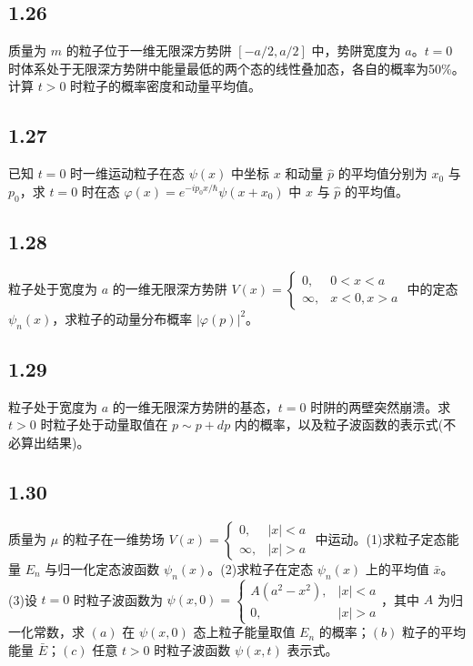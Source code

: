 \subsection{1.26}
质量为 $m$ 的粒子位于一维无限深方势阱 $[-a/2,a/2]$ 中，势阱宽度为 $a$。$t=0$ 时体系处于无限深方势阱中能量最低的两个态的线性叠加态，各自的概率为50\%。计算 $t>0$ 时粒子的概率密度和动量平均值。

\subsection{1.27}
已知 $t = 0$ 时一维运动粒子在态 $\psi (x)$ 中坐标 $x$ 和动量 $\hat{p}$ 的平均值分别为 $x_0$ 与 $p_0$，求 $t = 0$ 时在态 $\varphi (x) = e^{-ip_0 x/\hbar} \psi (x + x_0)$ 中 $x$ 与 $\hat{p}$ 的平均值。

\subsection{1.28}
粒子处于宽度为 $a$ 的一维无限深方势阱 $V(x) = \begin{cases} 
0, & 0 < x < a \\ 
\infty, & x < 0, x > a 
\end{cases}$ 中的定态 $\psi_n(x)$，求粒子的动量分布概率 $|\varphi(p)|^2$。

\subsection{1.29}
粒子处于宽度为 $a$ 的一维无限深方势阱的基态，$t = 0$ 时阱的两壁突然崩溃。求 $t > 0$ 时粒子处于动量取值在 $p \sim p + dp$ 内的概率，以及粒子波函数的表示式(不必算出结果)。

\subsection{1.30}
质量为 $\mu$ 的粒子在一维势场 $V(x) = \begin{cases}
0, & |x| < a \\
\infty, & |x| > a
\end{cases}$ 中运动。(1)求粒子定态能量 $E_n$ 与归一化定态波函数 $\psi_n(x)$。(2)求粒子在定态 $\psi_n(x)$ 上的平均值 $\bar{x}$。(3)设 $t = 0$ 时粒子波函数为 $\psi(x,0) = \begin{cases}
A(a^2 - x^2), & |x| < a \\
0, & |x| > a
\end{cases}$，其中 $A$ 为归一化常数，求 $(a)$ 在 $\psi(x,0)$ 态上粒子能量取值 $E_n$ 的概率；$(b)$ 粒子的平均能量 $\bar{E}$；$(c)$ 任意 $t > 0$ 时粒子波函数 $\psi(x,t)$ 表示式。

